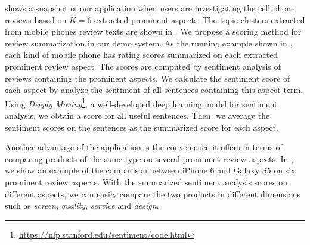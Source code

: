  shows a snapshot
of our application when users are investigating the cell phone reviews based on $K=6$ extracted prominent aspects. 
The topic clusters extracted from mobile phones review texts are shown
in .
We propose a scoring method for review summarization in our demo system. 
As the running example shown in ,
each kind of mobile phone has rating scores summarized on each extracted prominent review aspect.
The scores are computed by sentiment analysis of reviews containing the prominent aspects.
We calculate the sentiment score of each aspect by analyze the sentiment of all sentences containing this aspect term.
Using \textit{Deeply Moving}\footnote{\url{https://nlp.stanford.edu/sentiment/code.html}}, a well-developed deep learning model for sentiment analysis\cite{socher2013recursive}, we obtain a score for all useful sentences.
Then, we average the sentiment scores on the sentences as the summarized score
for each aspect.

Another advantage of the application is the convenience it offers in terms of comparing products of the same type on several prominent review aspects.
In ,
we show an example of the comparison between iPhone 6 and Galaxy S5 on six prominent review aspects.
With the summarized sentiment analysis scores on different aspects, 
we can easily compare the two products in different dimensions such as \textit{screen}, \textit{quality}, 
\textit{service} and \textit{design}.

